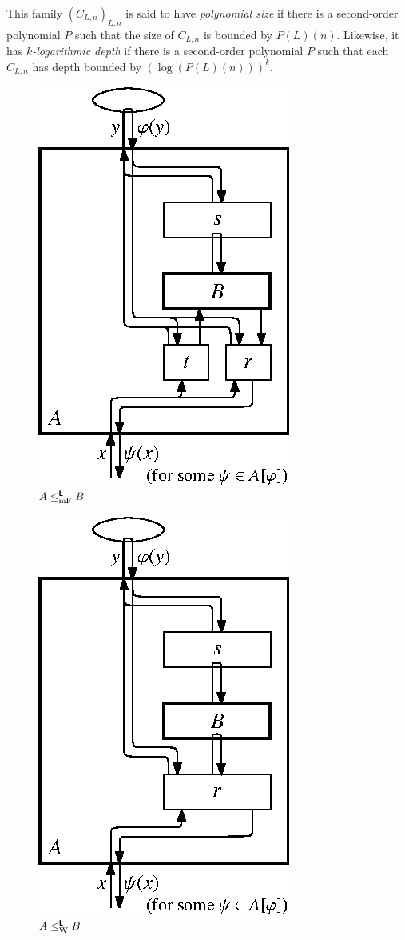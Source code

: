 \documentclass[conference]{IEEEtran}
\newcommand{\classtwofont}[1]{\text{\bfseries \sffamily \upshape #1}}
\newcommand{\classLtwo}{\classtwofont{L}}
\newcommand{\redW}{\leq _{\mathrm W}}
\newcommand{\redmF}{\leq _{\mathrm{mF}}}
\newcommand{\redLW}{\redW ^{\classLtwo}}
\newcommand{\redLmF}{\redmF ^{\classLtwo}}
\theoremstyle{definition}
\theoremstyle{remark}
\begin{document}
This family $(C_{L,n})_{L,n}$ is said to have
\emph{polynomial size} 
if there is a second-order polynomial $P$ such that 
the size of $C _{L,n}$ is bounded by $P (L) (n)$. 
Likewise, it has \emph{$k$-logarithmic depth}
if there is a second-order polynomial $P$ such that 
each $C _{L,n}$ has depth bounded by $(\log (P(L)(n))) ^k$. 

\begin{figure}
\begin{center}
\hfill
\parbox[t]{150pt}{\centering\includegraphics[scale=0.9]{./redtwom.eps}\\[3pt]$A \redLmF B$}
\hfill
\parbox[t]{150pt}{\centering\includegraphics[scale=0.9]{./redtwoT.eps}\\[3pt]$A \redLW B$}

\end{center}
\end{figure}
\end{document}
